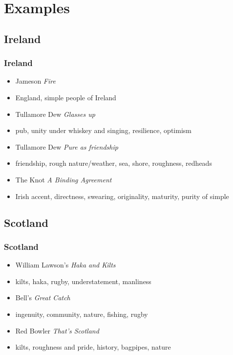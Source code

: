 \documentclass{beamer}
\begin{document}
\section{Examples}
\subsection{Ireland}

\begin{frame}
 \frametitle{Ireland}
 \begin{itemize}
  \item <1-> Jameson \emph{Fire}
  \item <2-> England, simple people of Ireland
  \item<3-> Tullamore Dew \emph{Glasses up}
  \item<4-> pub, unity under whiskey and singing, resilience, optimism
  \item<5-> Tullamore Dew \emph{Pure as friendship}
  \item<6-> friendship, rough nature/weather, sea, shore, roughness, redheads
  \item<7-> The Knot \emph{A Binding Agreement}
  \item<8> Irish accent, directness, swearing, originality, maturity, purity of simple
\end{itemize}
\end{frame}

\subsection{Scotland}

\begin{frame}
 \frametitle{Scotland}
 \begin{itemize}
  \item<1-> William Lawson's \emph{Haka and Kilts}
  \item<2-> kilts, haka, rugby, understatement, manliness
  \item<3-> Bell's \emph{Great Catch}
  \item<4-> ingenuity, community, nature, fishing, rugby
  \item<5-> Red Bowler \emph{That's Scotland}
  \item<6> kilts, roughness and pride, history, bagpipes, nature
 \end{itemize}
\end{frame}
\end{document}
